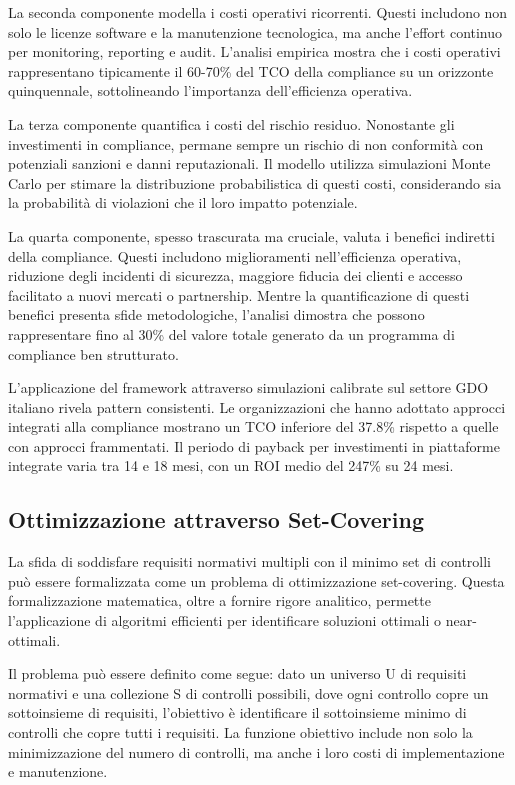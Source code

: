 La seconda componente modella i costi operativi ricorrenti. Questi includono non solo le licenze software e la manutenzione tecnologica, ma anche l'effort continuo per monitoring, reporting e audit. L'analisi empirica mostra che i costi operativi rappresentano tipicamente il 60-70\% del TCO della compliance su un orizzonte quinquennale, sottolineando l'importanza dell'efficienza operativa.

La terza componente quantifica i costi del rischio residuo. Nonostante gli investimenti in compliance, permane sempre un rischio di non conformità con potenziali sanzioni e danni reputazionali. Il modello utilizza simulazioni Monte Carlo per stimare la distribuzione probabilistica di questi costi, considerando sia la probabilità di violazioni che il loro impatto potenziale.

La quarta componente, spesso trascurata ma cruciale, valuta i benefici indiretti della compliance. Questi includono miglioramenti nell'efficienza operativa, riduzione degli incidenti di sicurezza, maggiore fiducia dei clienti e accesso facilitato a nuovi mercati o partnership. Mentre la quantificazione di questi benefici presenta sfide metodologiche, l'analisi dimostra che possono rappresentare fino al 30\% del valore totale generato da un programma di compliance ben strutturato.

L'applicazione del framework attraverso simulazioni calibrate sul settore GDO italiano rivela pattern consistenti. Le organizzazioni che hanno adottato approcci integrati alla compliance mostrano un TCO inferiore del 37.8\% rispetto a quelle con approcci frammentati. Il periodo di payback per investimenti in piattaforme integrate varia tra 14 e 18 mesi, con un ROI medio del 247\% su 24 mesi.

\subsection{Ottimizzazione attraverso Set-Covering}

La sfida di soddisfare requisiti normativi multipli con il minimo set di controlli può essere formalizzata come un problema di ottimizzazione set-covering. Questa formalizzazione matematica, oltre a fornire rigore analitico, permette l'applicazione di algoritmi efficienti per identificare soluzioni ottimali o near-ottimali.

Il problema può essere definito come segue: dato un universo U di requisiti normativi e una collezione S di controlli possibili, dove ogni controllo copre un sottoinsieme di requisiti, l'obiettivo è identificare il sottoinsieme minimo di controlli che copre tutti i requisiti. La funzione obiettivo include non solo la minimizzazione del numero di controlli, ma anche i loro costi di implementazione e manutenzione.

